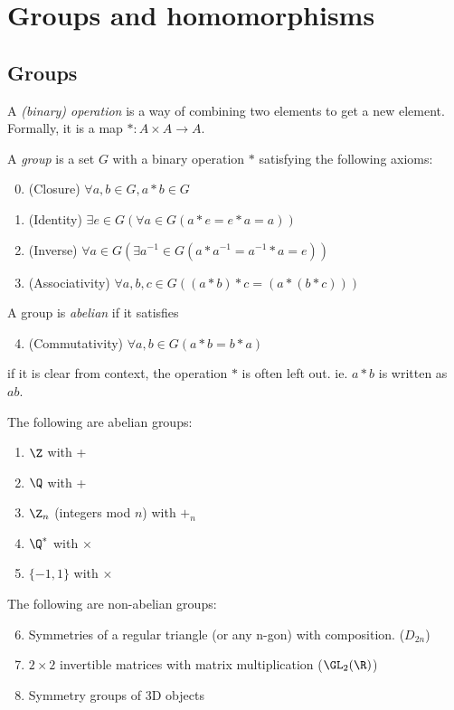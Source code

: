 \documentclass[a4paper]{article}
\begin{document}
  \section{Groups and homomorphisms}
  \subsection{Groups}
  \begin{defi}
    A \emph{(binary) operation} is a way of combining two elements to get a new element. Formally, it is a map $*: A \times A \rightarrow A$.
  \end{defi}
  \begin{defi}[Group]
    A \emph{group} is a set $G$ with a binary operation $*$ satisfying the following axioms:
    \begin{enumerate}[label=\arabic{*}.]
        \setcounter{enumi}{-1}
      \item (Closure) $\forall a, b\in G, a*b\in G$
      \item (Identity) $\exists e\in G(\forall a\in G (a*e = e*a = a))$
      \item (Inverse) $\forall a\in G(\exists a^{-1}\in G (a*a^{-1} = a^{-1}*a = e))$
      \item (Associativity) $\forall a, b, c\in G( (a*b)*c = (a*(b*c)))$
    \end{enumerate}
  \end{defi}
  \begin{defi}
    A group is \emph{abelian} if it satisfies
    \begin{enumerate}[label=\arabic{*}.]
        \setcounter{enumi}{3}
      \item (Commutativity) $\forall a, b\in G (a*b = b*a)$
    \end{enumerate}
  \end{defi}
  \note if it is clear from context, the operation $*$ is often left out. ie. $a*b$ is written as $ab$.
  \begin{eg}
    The following are abelian groups:
    \begin{enumerate}
      \item $\Z$ with +
      \item $\Q$ with +
      \item $\Z_n$ (integers mod $n$) with $+_n$
      \item $\Q^*$ with $\times$
      \item $\{-1, 1\}$ with $\times$
    \end{enumerate}
    The following are non-abelian groups:
    \begin{enumerate}
        \setcounter{enumi}{5}
      \item Symmetries of a regular triangle (or any n-gon) with composition. ($D_{2n}$)
      \item $2\times 2$ invertible matrices with matrix multiplication ($\GL_2(\R)$)
      \item Symmetry groups of 3D objects
    \end{enumerate}
  \end{eg}
\end{document}
